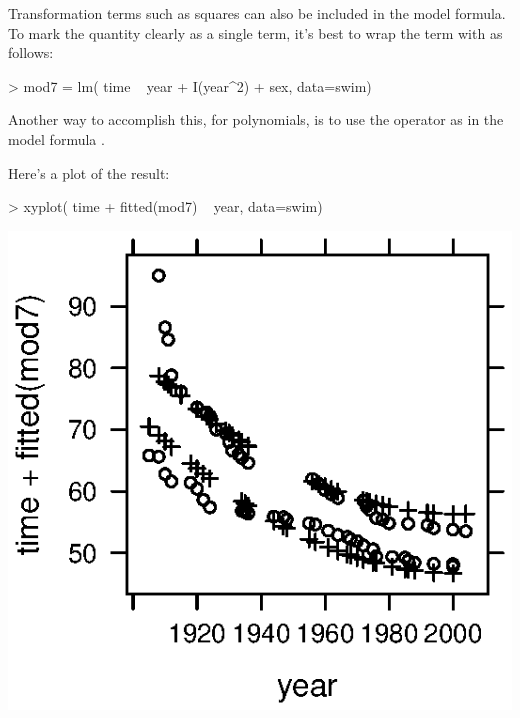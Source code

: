 Transformation terms such as squares can also be included in the model formula. 
To mark the quantity clearly as a single term, it's best to wrap the
term with  as follows:
\begin{Schunk}
\begin{Sinput}
> mod7 = lm( time ~ year + I(year^2) + sex, data=swim)
\end{Sinput}
\end{Schunk}

Another way to accomplish this, for polynomials, is to use the
operator  as in the model formula .

Here's a plot of the result:
\begin{Schunk}
\begin{Sinput}
> xyplot( time + fitted(mod7) ~ year, data=swim)
\end{Sinput}
\end{Schunk}
\includegraphics{Figures/language-fitted4}


